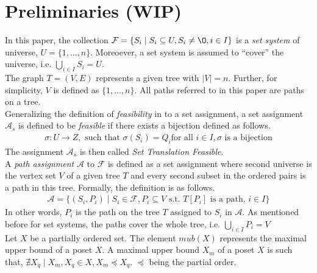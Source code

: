 \documentclass{llncs}
\def\cF{{\cal F}}
\def\F{{\mathcal F}}
\def\A{{\mathcal A}}
\begin{document}

\section{Preliminaries (WIP)}
In this paper, the collection $\F = \{S_i \mid S_i \subseteq U, S_i
\ne \O, i \in I\}$ is a {\em set system} of universe, $U = \{1,
\ldots, n\}$. Moreoever, a set system is assumed to ``cover'' the universe,
i.e. $ \bigcup_{i \in I}S_i = U$. \\

\noindent
The graph $T=(V,E)$ represents a given tree with $|V| = n$. Further,
for simplicity, $V$ is defined as $\{1,\ldots,n\}$. All paths
referred to in this paper are paths on a tree. \\

\noindent
Generalizing the definition of {\em feasibility} in \cite{nsnrs09} to
a set assignment, a set assignment $\A_s$ is defined to be {\em
  feasible} if there exists a bijection defined as follows.
\begin{align}
  \sigma: U \rightarrow Z, \text{ such that }\sigma(S_i) = Q_i \text{
    for all } i \in I, \sigma \text{ is a bijection}
\label{eq:stf}
\end{align}
The assignment $\A_s$ is then called {\em Set Translation Feasible}.\\

\noindent
A {\em path assignment} $\A$ to $\F$ is defined as a set assignment
where second universe is the vertex set $V$ of a given tree $T$ and
every second subset in the ordered pairs is a path in this tree. Formally, the definition is as follows.
\begin{align*}
  \A = \{ (S_i,P_i) \mid  S_i \in \F, P_i \subseteq V \text{ s.t. }T[P_i]
  \text{ is a path, } i \in I \}
\end{align*}
In other words, $P_i$ is the path on the tree $T$ assigned to $S_i$ in
$\A$. As mentioned before for set systems, the paths cover the whole
tree, i.e. $\bigcup_{i \in I}P_i = V$ \\

\noindent
Let $X$ be a partially ordered set. The element $mub(X)$ represents
the maximal upper bound of a poset $X$. A maximal upper bound $X_m$ of
a poset $X$ is such that, $\nexists X_q \mid X_m,X_q \in X, X_m
\preccurlyeq X_q$. $\preccurlyeq$ being the partial order.\\
\end{document}
